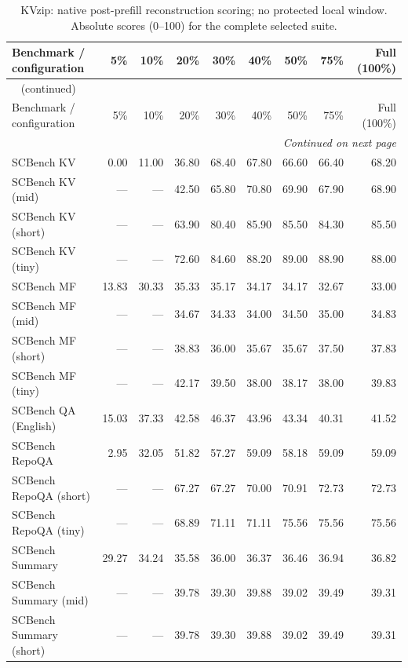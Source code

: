 \begingroup
\small
\setlength{\tabcolsep}{4pt}
\begin{longtable}{@{}lrrrrrrrr@{}}
\caption{KVzip: native post-prefill reconstruction scoring; no protected local window. Absolute scores (0--100) for the complete selected suite.}
\label{tab:results-kvzip} \\
\hline
Benchmark / configuration & 5\% & 10\% & 20\% & 30\% & 40\% & 50\% & 75\% & Full (100\%) \\
\hline
\endfirsthead
\multicolumn{9}{l}{\tablename\ \thetable{} (continued)} \\
\hline
Benchmark / configuration & 5\% & 10\% & 20\% & 30\% & 40\% & 50\% & 75\% & Full (100\%) \\
\hline
\endhead
\hline
\multicolumn{9}{r}{\emph{Continued on next page}} \\
\endfoot
\hline
\endlastfoot
SCBench KV & 0.00 & 11.00 & 36.80 & 68.40 & 67.80 & 66.60 & 66.40 & 68.20 \\
SCBench KV (mid) & --- & --- & 42.50 & 65.80 & 70.80 & 69.90 & 67.90 & 68.90 \\
SCBench KV (short) & --- & --- & 63.90 & 80.40 & 85.90 & 85.50 & 84.30 & 85.50 \\
SCBench KV (tiny) & --- & --- & 72.60 & 84.60 & 88.20 & 89.00 & 88.90 & 88.00 \\
SCBench MF & 13.83 & 30.33 & 35.33 & 35.17 & 34.17 & 34.17 & 32.67 & 33.00 \\
SCBench MF (mid) & --- & --- & 34.67 & 34.33 & 34.00 & 34.50 & 35.00 & 34.83 \\
SCBench MF (short) & --- & --- & 38.83 & 36.00 & 35.67 & 35.67 & 37.50 & 37.83 \\
SCBench MF (tiny) & --- & --- & 42.17 & 39.50 & 38.00 & 38.17 & 38.00 & 39.83 \\
SCBench QA (English) & 15.03 & 37.33 & 42.58 & 46.37 & 43.96 & 43.34 & 40.31 & 41.52 \\
SCBench RepoQA & 2.95 & 32.05 & 51.82 & 57.27 & 59.09 & 58.18 & 59.09 & 59.09 \\
SCBench RepoQA (short) & --- & --- & 67.27 & 67.27 & 70.00 & 70.91 & 72.73 & 72.73 \\
SCBench RepoQA (tiny) & --- & --- & 68.89 & 71.11 & 71.11 & 75.56 & 75.56 & 75.56 \\
SCBench Summary & 29.27 & 34.24 & 35.58 & 36.00 & 36.37 & 36.46 & 36.94 & 36.82 \\
SCBench Summary (mid) & --- & --- & 39.78 & 39.30 & 39.88 & 39.02 & 39.49 & 39.31 \\
SCBench Summary (short) & --- & --- & 39.78 & 39.30 & 39.88 & 39.02 & 39.49 & 39.31 \\

\end{longtable}

